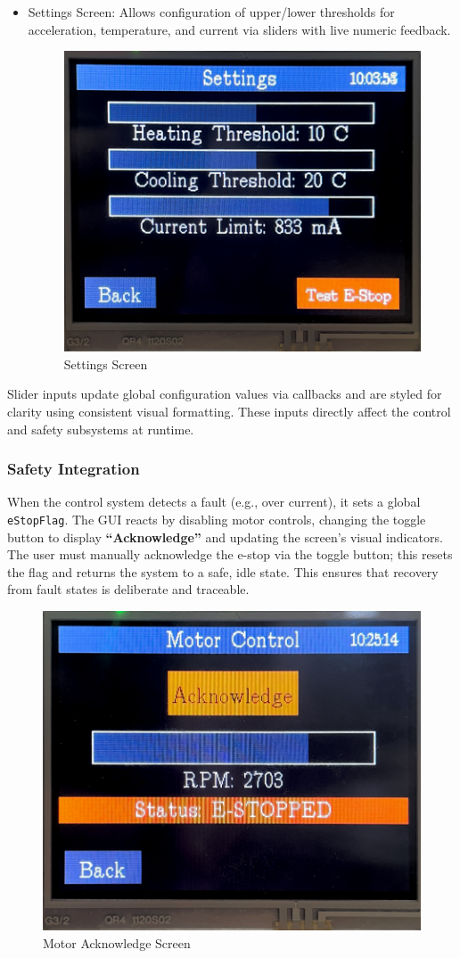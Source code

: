 \documentclass[a4paper, 11pt, titlepage]{article}
\begin{document}
\begin{itemize}
\item Settings Screen: Allows configuration of upper/lower thresholds for acceleration, temperature, and current via sliders with live numeric feedback.
\begin{figure}[H]
    \centering
    \includegraphics[width=0.7\linewidth]{images/Settings.png}
    \caption{Settings Screen}
    \label{fig:settings_screen}
\end{figure}

\end{itemize} 
Slider inputs update global configuration values via callbacks and are styled for clarity using consistent visual formatting. These inputs directly affect the control and safety subsystems at runtime. \\

\subsubsection{Safety Integration}
When the control system detects a fault (e.g., over current), it sets a global \verb|eStopFlag|. The GUI reacts by disabling motor controls, changing the toggle button to display \textbf{“Acknowledge”} and updating the screen’s visual indicators. The user must manually acknowledge the e-stop via the toggle button; this resets the flag and returns the system to a safe, idle state. This ensures that recovery from fault states is deliberate and traceable.\\
\begin{figure}[H]
    \centering
    \includegraphics[width=0.7\linewidth]{images/Acknowledge.png}
    \caption{Motor Acknowledge Screen}
    \label{fig:motor_ack_screen}
\end{figure}
\end{document}
